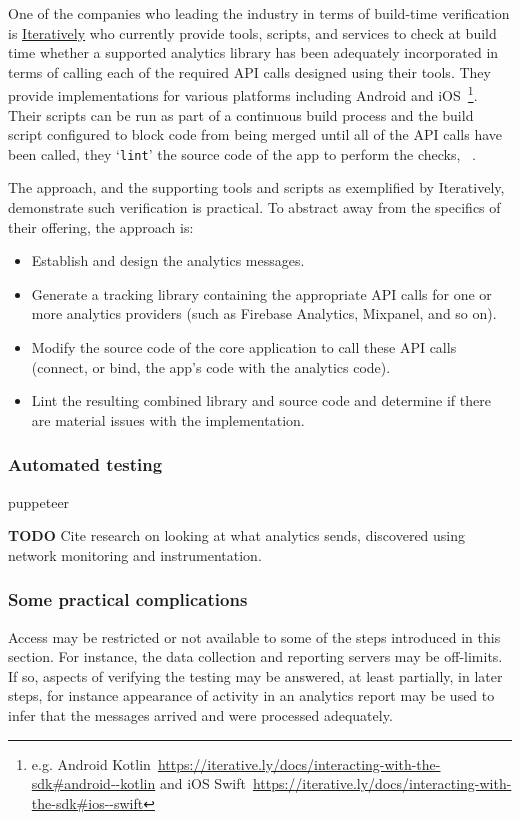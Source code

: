 One of the companies who leading the industry in terms of build-time verification is \href{https://iterative.ly}{Iteratively} who currently provide tools, scripts, and services to check at build time whether a supported analytics library has been adequately incorporated in terms of calling each of the required API calls designed using their tools. They provide implementations for various platforms including Android and iOS~\footnote{e.g. Android Kotlin~\url{https://iterative.ly/docs/interacting-with-the-sdk\#android--kotlin} and iOS Swift~\url{https://iterative.ly/docs/interacting-with-the-sdk\#ios--swift}}. Their scripts can be run as part of a continuous build process and the build script configured to block code from being merged until all of the API calls have been called, they `\texttt{lint}' the source code of the app to perform the checks, ~\cite{using_the_itly_cli_verify_the_instrumentation, using_the_itly_cli_itly_verify}.

The approach, and the supporting tools and scripts as exemplified by Iteratively, demonstrate such verification is practical. To abstract away from the specifics of their offering, the approach is:
\begin{itemize}
    \item Establish and design the analytics messages.
    \item Generate a tracking library containing the appropriate API calls for one or more analytics providers (such as Firebase Analytics, Mixpanel, and so on).
    \item Modify the source code of the core application to call these API calls (connect, or bind, the app's code with the analytics code).
    \item Lint the resulting combined library and source code and determine if there are material issues with the implementation.
\end{itemize}

\subsubsection{Automated testing}
puppeteer~\cite{using_puppeteer_to_automate_your_google_analytics_testing}

\textbf{TODO} Cite research on looking at what analytics sends, discovered using network monitoring and instrumentation. 

\subsubsection{Some practical complications} 
Access may be restricted or not available to some of the steps introduced in this section. For instance, the data collection and reporting servers may be off-limits. If so, aspects of verifying the testing may be answered, at least partially, in later steps, for instance appearance of activity in an analytics report may be used to infer that the messages arrived and were processed adequately.

